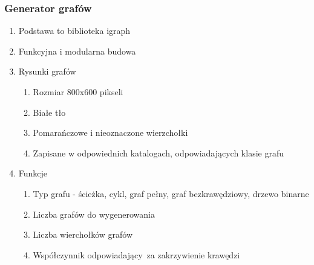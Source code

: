 \begin{frame}
    \frametitle{Generator grafów}

    \begin{enumerate}
        \item Podstawa to biblioteka igraph
        \item Funkcyjna i modularna budowa
        \item Rysunki grafów
            \begin{enumerate}
                \item Rozmiar 800x600 pikseli
                \item Białe tło
                \item Pomarańczowe i nieoznaczone wierzchołki
                \item Zapisane w odpowiednich katalogach, odpowiadających klasie grafu
            \end{enumerate}
        \item Funkcje
            \begin{enumerate}
                \item Typ grafu - ścieżka, cykl, graf pełny, graf bezkrawędziowy, drzewo binarne
                \item Liczba grafów do wygenerowania
                \item Liczba wierchołków grafów
                \item Współczynnik odpowiadający~za zakrzywienie krawędzi
            \end{enumerate}
    \end{enumerate}

\end{frame}
